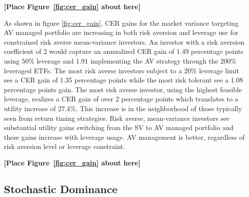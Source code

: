 \bigskip
\centerline{\bf [Place Figure~\ref{fig:cer_gain} about here]}
\bigskip

As shown in figure \ref{fig:cer_gain}, CER gains for the market variance targeting AV managed portfolio are increasing in both risk aversion and leverage use for constrained risk averse mean-variance investors. An investor with a risk aversion coefficient of 2 would capture an annualized CER gain of 1.49 percentage points using 50\% leverage and 1.91 implementing the AV strategy through the 200\% leveraged ETFs. The most risk averse investors subject to a 20\% leverage limit see a CER gain of 1.35 percentage points while the most risk tolerant see a 1.08 percentage points gain. The most risk averse investor, using the highest feasible leverage, realizes a CER gain of over 2 percentage points which translates to a utility increase of 27.4\%. This increase is in the neighborhood of those typically seen from return timing strategies. \citep{campbell1997econometrics,moreira_volatility-managed_2017} Risk averse, mean-variance investors see substantial utility gains switching from the SV to AV managed portfolio and these gains increase with leverage usage. AV management is better, regardless of risk aversion level or leverage constraint.

\bigskip
\centerline{\bf [Place Figure~\ref{fig:cer_gain} about here]}
\bigskip

\subsection{Stochastic Dominance}


